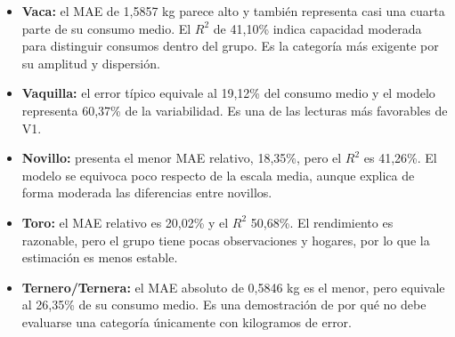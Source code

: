 \documentclass[11pt,a4paper]{article}
\begin{document}
\begin{table}[H]
\centering
\caption{Lectura relativa de V1 Ridge por categoría.}
\end{table}

\begin{itemize}
  \item \textbf{Vaca:} el MAE de 1,5857 kg parece alto y también representa casi una cuarta parte de su consumo medio. El $R^2$ de 41,10\% indica capacidad moderada para distinguir consumos dentro del grupo. Es la categoría más exigente por su amplitud y dispersión.
  \item \textbf{Vaquilla:} el error típico equivale al 19,12\% del consumo medio y el modelo representa 60,37\% de la variabilidad. Es una de las lecturas más favorables de V1.
  \item \textbf{Novillo:} presenta el menor MAE relativo, 18,35\%, pero el $R^2$ es 41,26\%. El modelo se equivoca poco respecto de la escala media, aunque explica de forma moderada las diferencias entre novillos.
  \item \textbf{Toro:} el MAE relativo es 20,02\% y el $R^2$ 50,68\%. El rendimiento es razonable, pero el grupo tiene pocas observaciones y hogares, por lo que la estimación es menos estable.
  \item \textbf{Ternero/Ternera:} el MAE absoluto de 0,5846 kg es el menor, pero equivale al 26,35\% de su consumo medio. Es una demostración de por qué no debe evaluarse una categoría únicamente con kilogramos de error.
\end{itemize}
\end{document}
